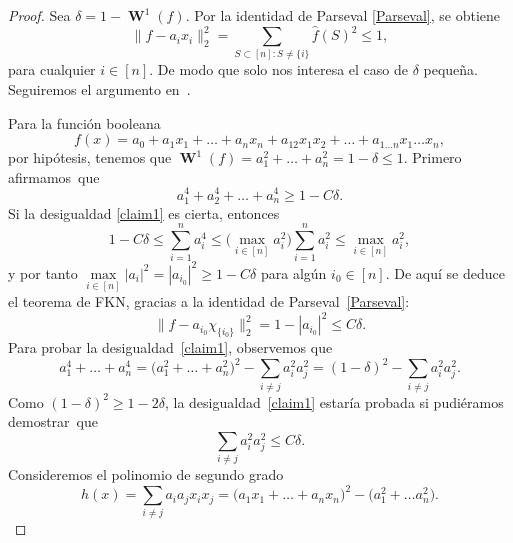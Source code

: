 \documentclass[autocontact]{gaceta}
\DeclareMathOperator{\WW}{\mathbf{W}}
\begin{document}
\begin{proof} Sea $\delta = 1 - \WW^1(f)$. Por la identidad de Parseval \eqref{Parseval}, se obtiene
\[
\|f-a_i x_i\|_2^2 = \sum_{S\subset [n] \colon S \neq \{i\} } \widehat{f}(S)^2 \leq 1,
\]
para cualquier $i\in [n]$. De modo que solo nos interesa el caso de $\delta$ pequeña. Seguiremos el argumento en~\cite[lecture 6]{Min24}.

Para la función booleana
\[
   f(x)=a_0+a_1x_1+\dots + a_nx_n + a_{12}x_1x_2+\dots + a_{1\dots n}x_1\dots x_n,
\]
por hipótesis, tenemos que $\WW^1(f)= a_1^2 +\dots + a_n^2=1-\delta \leq 1$.
Primero afirmamos~que
\begin{equation}\label{claim1}
a_1^4+a_2^4+\dots + a_n^4 \geq 1-C\delta.
\end{equation}
Si la desigualdad \eqref{claim1} es cierta, entonces
\[
   1-C\delta \leq \sum_{i=1}^n a_i^4
   \leq \big(\max_{i\in [n]} a_i^2\big) \sum_{i=1}^n a_i^2
   \leq \max_{i\in [n]} a_i^2,
\]
y por tanto $\max\limits_{i\in [n]} |a_i|^2=|a_{i_0}|^2 \geq 1-C\delta$ para algún $i_0\in [n]$. De aquí se deduce el teorema de FKN, gracias a la identidad de Parseval~\eqref{Parseval}:
\[
   \|f-a_{i_{0}}\chi_{\{i_0\}}\|^2_2=1-|a_{i_0}|^2\leq C\delta.
\]
Para probar la desigualdad~\eqref{claim1}, observemos que
\[
   a_1^4 + \dots + a_n^4 
   = \big(a_1^2+\dots +a_n^2\big)^2 - \sum_{i\neq j} a_i^2a_j^2
   = (1-\delta)^2-\sum_{i\neq j} a_i^2a_j^2.
\]
Como $(1-\delta)^2\geq 1-2\delta$, la desigualdad~\eqref{claim1} estaría probada si pudiéramos demostrar~que
\[
   \sum_{i\neq j} a_i^2a_j^2\leq C\delta.
\]
Consideremos el polinomio de segundo grado
\[
   h(x) = \sum_{i\neq j} a_i a_j x_i x_j
   = \big(a_1x_1+\dots +a_nx_n\big)^2-\big(a_1^2+\dots a_n^2\big).
\]


\end{proof}
\end{document}
